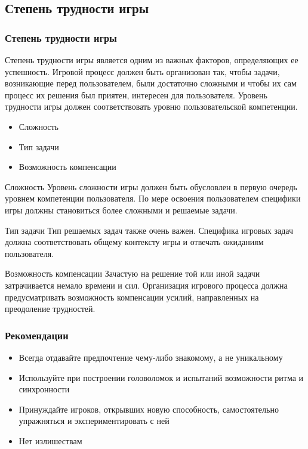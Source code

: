 \documentclass[10pt]{beamer}
\begin{document}
\subsection{Степень трудности игры}
\begin{frame}
\frametitle{Степень трудности игры}

\begin{block}{}
  Степень трудности игры является одним из важных факторов, определяющих ее успешность. Игровой процесс должен быть организован так, чтобы задачи, возникающие перед пользователем, были достаточно сложными и чтобы их сам процесс их решения был приятен, интересен для пользователя. Уровень трудности игры должен соответствовать уровню пользовательской компетенции.
  \begin{itemize}
    \item Сложность
    \item Тип задачи
    \item Возможность компенсации
  \end{itemize}
\end{block}

\end{frame}

\begin{frame}

\begin{block}{Сложность}
  Уровень сложности игры должен быть обусловлен в первую очередь уровнем компетенции пользователя. По мере освоения пользователем специфики игры должны становиться более сложными и решаемые задачи.
\end{block}

\begin{block}{Тип задачи}
  Тип решаемых задач также очень важен. Специфика игровых задач должна соответствовать общему контексту игры и отвечать ожиданиям пользователя.
\end{block}

\begin{block}{Возможность компенсации}
  Зачастую на решение той или иной задачи затрачивается немало времени и сил. Организация игрового процесса должна предусматривать возможность компенсации усилий, направленных на преодоление трудностей.
\end{block}

\end{frame}

\begin{frame}
\frametitle{Рекомендации}

\begin{block}{}
  \begin{itemize}
    \item Всегда отдавайте предпочтение чему-либо знакомому, а не уникальному
    \item Используйте при построении головоломок и испытаний возможности ритма и синхронности
    \item Принуждайте игроков, открывших новую способность, самостоятельно упражняться и экспериментировать с ней
    \item Нет излишествам
  \end{itemize}
\end{block}

\end{frame}
\end{document}
